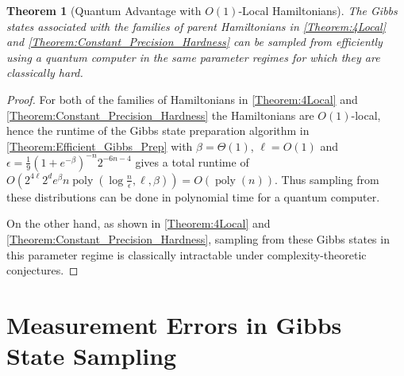\documentclass[a4paper,onecolumn,11pt,accepted=2017-05-09]{quantumarticle}
\DeclareMathOperator{\poly}{poly}
\newtheorem{theorem}{Theorem}
\begin{document}
\begin{theorem}[Quantum Advantage with $O(1)$-Local Hamiltonians]
    The Gibbs states associated with the families of parent Hamiltonians in \cref{Theorem:4Local} and \cref{Theorem:Constant_Precision_Hardness} can be sampled from efficiently using a quantum computer in the same parameter regimes for which they are classically hard.
\end{theorem}
\begin{proof}
    For both of the families of Hamiltonians in \cref{Theorem:4Local} and \cref{Theorem:Constant_Precision_Hardness} the Hamiltonians are $O(1)$-local, hence the runtime of the Gibbs state preparation algorithm in \cref{Theorem:Efficient_Gibbs_Prep} with $\beta=\Theta(1)$, $\ell=O(1)$ and 
 $\epsilon=\frac{1}{9}(1+e^{-\beta})^{-n}2^{-6n-4}$ gives a total runtime of $O(2^{4\ell}2^d e^\beta n\poly(\log \frac{n}{\epsilon},\ell,\beta)) = O(\poly(n))$.
 Thus sampling from these distributions can be done in polynomial time for a quantum computer.
 
 On the other hand, as shown in \cref{Theorem:4Local} and \cref{Theorem:Constant_Precision_Hardness}, sampling from these Gibbs states in this parameter regime is classically intractable under complexity-theoretic conjectures.
\end{proof}



\section{Measurement Errors in Gibbs State Sampling}
\label{Sec:Measurement_Errors}
\end{document}
